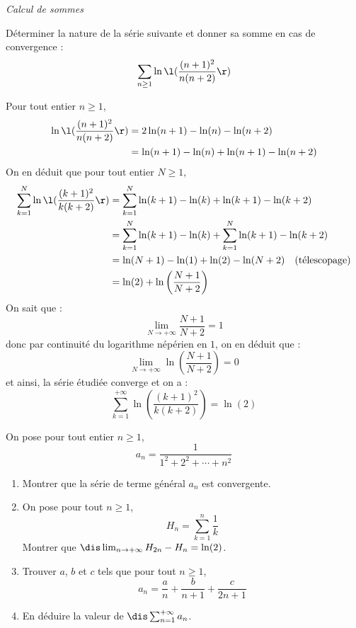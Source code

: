 \documentclass[a4paper,10pt]{report}
\begin{document}
\medskip

\begin{center}
\textit{{ {\large Calcul de sommes}}}
\end{center}

\medskip

\begin{Exercice}{} Déterminer la nature de la série suivante et donner sa somme en cas de convergence : 
$$ \sum_{n \geq 1} \ln \l( \frac{(n+1)^2}{n(n+2)}\r)$$
\end{Exercice}

\corr Pour tout entier $n \geq 1$,
\begin{align*}
\ln \l( \frac{(n+1)^2}{n(n+2)}\r) & = 2\ln(n+1)- \ln(n)- \ln(n+2) \\
& = \ln(n+1)-\ln(n) + \ln(n+1)-\ln(n+2)
\end{align*}
On en déduit que pour tout entier $N \geq 1$,
\begin{align*}
\sum_{k=1}^N \ln \l( \frac{(k+1)^2}{k(k+2)}\r) &= \sum_{k=1}^N \ln(k+1)-\ln(k) + \ln(k+1)-\ln(k+2) \\
& = \sum_{k=1}^N \ln(k+1)-\ln(k) + \sum_{k=1}^N \ln(k+1)-\ln(k+2) \\
& = \ln(N+1) - \ln(1) + \ln(2)- \ln(N+2) \quad \hbox{(télescopage)} \\
& = \ln(2) + \ln \left( \dfrac{N+1}{N+2} \right)
\end{align*}
On sait que :
$$ \lim_{N \rightarrow + \infty} \dfrac{N+1}{N+2}=1$$
donc par continuité du logarithme népérien en $1$, on en déduit que :
$$ \lim_{N \rightarrow + \infty} \ln \left( \dfrac{N+1}{N+2} \right)=0$$
et ainsi, la série étudiée converge et on a :
$$ \sum_{k=1}^{+ \infty} \ln \left( \dfrac{(k+1)^2}{k(k+2)} \right) = \ln(2) $$


\medskip

\begin{Exercice}{} On pose pour tout entier $n \geq 1$,
$$ a_n = \dfrac{1}{1^2+2^2 + \cdots + n^2}$$
\begin{enumerate}
\item Montrer que la série de terme général $a_n$ est convergente.
\item On pose pour tout $n \geq 1$,
$$ H_n = \sum_{k=1}^n \dfrac{1}{k}$$
Montrer que $\dis \lim_{n \rightarrow + \infty} H_{2n}-H_n = \ln(2)$.
\item Trouver $a$, $b$ et $c$ tels que pour tout $n \geq 1$,
$$ a_n = \dfrac{a}{n} + \dfrac{b}{n+1} + \dfrac{c}{2n+1}$$
\item En déduire la valeur de $\dis \sum_{n=1}^{+ \infty} a_n$.
\end{enumerate}
\end{Exercice}
\end{document}
